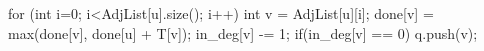 \begin{exerciseanswer}
\begin{cppcode}
    for (int i=0; i<AdjList[u].size(); i++) {
        int v = AdjList[u][i];
        done[v] = max(done[v], done[u] + T[v]);
        in_deg[v] -= 1;
        if(in_deg[v] == 0) {
            q.push(v);
        }
    }
\end{cppcode}

\vspace{\baselineskip}




\end{exerciseanswer}%

